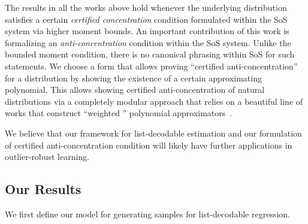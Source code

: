 The results in all the works above hold whenever the underlying distribution satisfies a certain \emph{certified concentration} condition formulated within the SoS system via higher moment bounds. An important contribution of this work is formalizing an \emph{anti-concentration} condition within the SoS system. Unlike the bounded moment condition, there is no canonical phrasing  within SoS for such statements. We choose a form that allows proving ``certified anti-concentration'' for a distribution by showing the existence of a certain approximating polynomial. This allows showing certified anti-concentration of natural distributions via a completely modular approach that relies on a beautiful line of works that construct ``weighted '' polynomial approximators~\cite{2007math......1099L}. 

We believe that our framework for list-decodable estimation and our formulation of certified anti-concentration condition will likely have further applications in outlier-robust learning. 
\subsection{Our Results}
We first define our model for generating samples for list-decodable regression.

